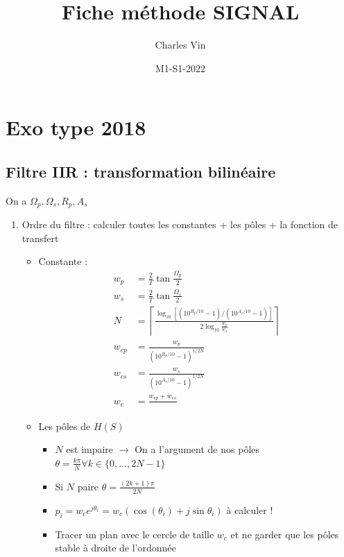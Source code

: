 \documentclass{article}
\title{Fiche méthode SIGNAL}
\author{Charles Vin}
\date{M1-S1-2022}
\begin{document}
\maketitle

\section{Exo type 2018}
\subsection{Filtre IIR : transformation bilinéaire}
On a $ \Omega _p, \Omega _s, R_p, A_s $ 
\begin{enumerate}
    \item Ordre du filtre : calculer toutes les constantes + les pôles + la fonction de transfert 
        \begin{itemize}
            \item Constante :
                \begin{align*}
                    w_p &= \frac{2}{T} \tan \frac{\Omega_p }{2} \\
                    w_s &= \frac{2}{T} \tan \frac{\Omega_s }{2} \\
                    N &= \left\lceil \frac{\log_{10} [(10^{R_p/10} - 1)/(10^{A_s/10} - 1)]}{2 \log_{10} \frac{w_p}{w_s}}\right\rceil \\
                    w_{cp} &= \frac{w_p}{(10^{R_p/10} - 1)^{1/2N}} \\
                    w_{cs} &= \frac{w_s}{(10^{A_s/10} - 1)^{1/2N}} \\
                    w_c &= \frac{w_{cp} + w_{cs}}{}
                \end{align*}
            \item Les pôles de $ H(S) $ 
                \begin{itemize}
                    \item $ N $ est impaire $\rightarrow$ On a l'argument de nos pôles $ \theta = \frac{k \pi }{N} \forall k \in \{0, \dots, 2N-1\} $ 
                    \item Si $ N $ paire $ \theta = \frac{(2k+1)\pi }{2N} $ 
                    \item $ p_i = w_c e^{j \theta_i } = w_c (\cos (\theta _i) + j \sin \theta _i)$ à calculer ! 
                    \item Tracer un plan avec le cercle de taille $ w_c $  et ne garder que les pôles stable à droite de l'ordonnée 
                \end{itemize}

\end{itemize}
\end{enumerate}
\end{document}
